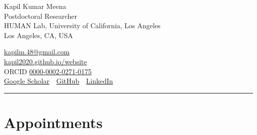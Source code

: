 \documentclass[10pt, a4paper]{article}
\begin{document}
\begin{minipage}[t]{0.56\linewidth}
  {\fontsize{24}{28}\selectfont Kapil Kumar Meena}\\[6pt]
  Postdoctoral Researcher\\
  HUMAN Lab, University of California, Los Angeles\\
  Los Angeles, CA, USA
\end{minipage}%
\hfill
\begin{minipage}[t]{0.40\linewidth}
  \raggedleft
  \vspace{4pt}
  \href{mailto:kapilm.48@gmail.com}{kapilm.48@gmail.com}\\
  \href{https://kapil2020.github.io/website/}{kapil2020.github.io/website}\\
  ORCID \href{https://orcid.org/0000-0002-0271-0175}{0000-0002-0271-0175}\\
  \href{https://scholar.google.com/citations?user=5jIAPTEAAAAJ&hl=en}{Google Scholar}
  \,\textperiodcentered\,
  \href{https://github.com/kapil2020}{GitHub}
  \,\textperiodcentered\,
  \href{https://www.linkedin.com/in/kapilmeena/}{LinkedIn}
\end{minipage}

\vspace{10pt}
{\color{rulegray}\rule{\linewidth}{0.4pt}}
\vspace{2pt}

\begin{cvlist}
\end{cvlist}

\section{Appointments}
\end{document}
